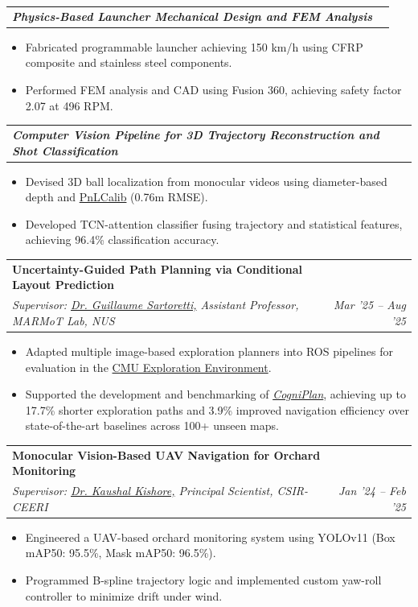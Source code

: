 \documentclass[letterpaper,10pt]{article}
\makeatletter
\newcommand{\resumeItem}[1]{
  \item \small{#1\vspace{-2pt}}
}
\newcommand{\resumeSubheading}[4]{
  \vspace{0pt}\item
  \begin{tabular*}{0.97\textwidth}[t]{l@{\extracolsep{\fill}}r}
    \textbf{#1} & \textbf{#2} \\
    \textit{\small #3} & \textit{\small #4} \\
  \end{tabular*}\vspace{-6pt}
}
\newcommand{\resumeSubSubheading}[2]{
  \vspace{0pt}\item
  \begin{tabular*}{0.97\textwidth}[t]{l@{\extracolsep{\fill}}r}
    \textit{\small #1} & \textit{\small #2} \\
  \end{tabular*}\vspace{-6pt}
}
\newcommand{\resumeItemListStart}{
  \begin{itemize}[leftmargin=0.18in]
}
\newcommand{\resumeItemListEnd}{
  \end{itemize}\vspace{-6pt}
}
\makeatother
\begin{document}
    \resumeSubSubheading
      {\textbf{\hspace{4pt}Physics-Based Launcher Mechanical Design and FEM Analysis}}{}
    \resumeItemListStart
      \resumeItem{Fabricated programmable launcher achieving 150 km/h using CFRP composite and stainless steel components.}
      \resumeItem{Performed FEM analysis and CAD using Fusion 360, achieving safety factor 2.07 at 496 RPM.}
    \resumeItemListEnd

    \resumeSubSubheading
      {\textbf{\hspace{4pt}Computer Vision Pipeline for 3D Trajectory Reconstruction and Shot Classification}}{}
    \resumeItemListStart
      \resumeItem{Devised 3D ball localization from monocular videos using diameter-based depth and {\color{blue}\href{https://github.com/mguti97/PnLCalib}{PnLCalib}}  (0.76m RMSE).}
      \resumeItem{Developed TCN-attention classifier fusing trajectory and statistical features, achieving 96.4\% classification accuracy.}
    \resumeItemListEnd

  \resumeSubheading
    {Uncertainty-Guided Path Planning via Conditional Layout Prediction \color{blue}\href{https://yizhuo-wang.com/cogniplan/}{\faExternalLink*}}{}
    {Supervisor: {\color{blue}\href{https://cde.nus.edu.sg/me/staff/sartoretti-guillaume-a/}{Dr. Guillaume Sartoretti,}} Assistant Professor, MARMoT Lab, NUS}{Mar '25 -- Aug '25}
  \resumeItemListStart
    \resumeItem{Adapted multiple image-based exploration planners into ROS pipelines for evaluation in the \color{blue}\href{https://www.cmu-exploration.com/}{CMU Exploration Environment}.}
    \resumeItem{Supported the development and benchmarking of \textit{\color{blue}\href{https://yizhuo-wang.com/cogniplan/}{CogniPlan}}, achieving up to 17.7\% shorter exploration paths and 3.9\% improved navigation efficiency over state-of-the-art baselines across 100+ unseen maps.}
  \resumeItemListEnd

  \resumeSubheading
    {Monocular Vision-Based UAV Navigation for Orchard Monitoring \color{blue}\href{https://github.com/Ritabrata-Chakraborty/Monocular-Vision-Based-UAV-Navigation-for-Orchard-Monitoring.git}{\faExternalLink*}}{}
    {Supervisor: {\color{blue}\href{https://ieeexplore.ieee.org/author/37085653936}{Dr. Kaushal Kishore,}} Principal Scientist, CSIR-CEERI}{Jan '24 -- Feb '25}
  \resumeItemListStart
    \resumeItem{Engineered a UAV-based orchard monitoring system using YOLOv11 (Box mAP50: 95.5\%, Mask mAP50: 96.5\%).}
    \resumeItem{Programmed B-spline trajectory logic and implemented custom yaw-roll controller to minimize drift under wind.}
  \resumeItemListEnd
\end{document}
